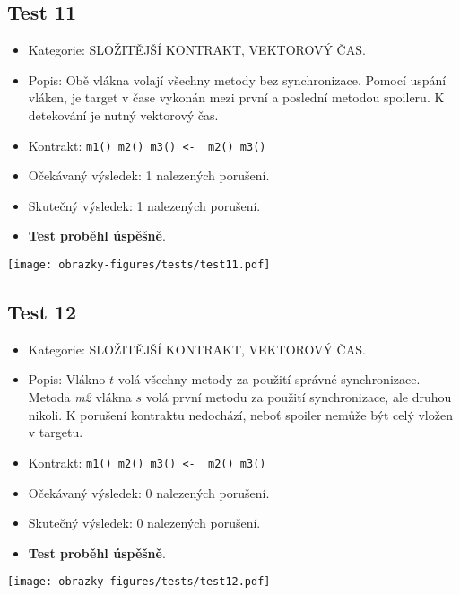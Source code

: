 \subsection*{Test 11}
\begin{itemize}
\item Kategorie: SLOŽITĚJŠÍ KONTRAKT, VEKTOROVÝ ČAS.
\item Popis: Obě vlákna volají všechny metody bez synchronizace. Pomocí uspání vláken, je target v čase vykonán mezi první a poslední metodou spoileru. K detekování je nutný vektorový čas.
\item Kontrakt: \texttt{m1() m2() m3() <- { m2() m3() }}

\item Očekávaný výsledek: 1 nalezených porušení.
\item Skutečný výsledek: 1 nalezených porušení.
\item \textbf{Test proběhl úspěšně}.
\end{itemize}
\begin{center}
    \centering
    \texttt{[image: obrazky-figures/tests/test11.pdf]}
    \label{test11}
\end{center}

\subsection*{Test 12}
\begin{itemize}
\item Kategorie: SLOŽITĚJŠÍ KONTRAKT, VEKTOROVÝ ČAS.
\item Popis: Vlákno $t$ volá všechny metody za použití správné synchronizace. Metoda \textit{m2} vlákna $s$ volá první metodu za použití synchronizace, ale druhou nikoli. K porušení kontraktu nedochází, neboť spoiler nemůže být celý vložen v targetu.
\item Kontrakt: \texttt{m1() m2() m3() <- { m2() m3() }}

\item Očekávaný výsledek: 0 nalezených porušení.
\item Skutečný výsledek: 0 nalezených porušení.
\item \textbf{Test proběhl úspěšně}.
\end{itemize}
\begin{center}
    \centering
    \texttt{[image: obrazky-figures/tests/test12.pdf]}
    \label{test12}
\end{center}

